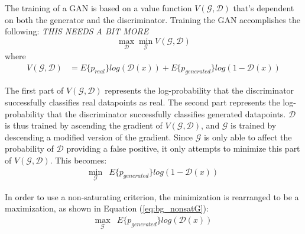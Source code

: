 \documentclass[11pt]{report}
\begin{document}
	\par The training of a GAN is based on a value function $V(\mathcal{G},\mathcal{D})$ that's dependent on both the generator and the discriminator. Training the GAN accomplishes the following: \textit{THIS NEEDS A BIT MORE}
	\[ \max_\mathcal{D}\min_\mathcal{G} V(\mathcal{G},\mathcal{D}) \] where
	\begin{align}
		V(\mathcal{G},\mathcal{D}) &= E\{p_{real}\}log(\mathcal{D}(x)) + E\{p_{generated}\} log(1-\mathcal{D}(x))
	\end{align}
	\par The first part of $V(\mathcal{G},\mathcal{D})$ represents the log-probability that the discriminator successfully classifies real datapoints as real. The second part represents the log-probability that the discriminator successfully classifies generated datapoints. $\mathcal{D}$ is thus trained by ascending the gradient of $V(\mathcal{G},\mathcal{D})$, and $\mathcal{G}$ is trained by descending a modified version of the gradient. Since $\mathcal{G}$ is only able to affect the probability of $\mathcal{D}$ providing a false positive, it only attempts to minimize this part of $V(\mathcal{G},\mathcal{D})$. This becomes:
	\begin{align}
		\min_\mathcal{G}& E\{p_{generated}\} log(1-\mathcal{D}(x))
	\end{align}
	\par In order to use a non-saturating criterion, the minimization is rearranged to be a maximization, as shown in Equation (\ref{eq:bg_nonsatG}):
	\begin{align}
		\max_\mathcal{G}&E\{p_{generated}\} log(\mathcal{D}(x)) \label{eq:bg_nonsatG} 
	\end{align}
	
\end{document}
